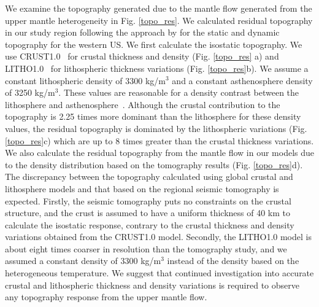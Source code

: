 \documentclass[draft,linenumbers]{agujournal2018}
\begin{document}
    We examine the topography generated due to the mantle flow generated from the upper mantle heterogeneity in Fig. \ref{topo_res}. We calculated residual topography in our study region following the approach by \citet{becker2014static} for the static and dynamic topography for the western US. We first calculate the isostatic topography. We use CRUST1.0~\citep{laske2013update} for crustal thickness and density (Fig. \ref{topo_res} a) and LITHO1.0~\citep{pasyanos2014litho1} for lithospheric thickness variations (Fig. \ref{topo_res}b). We assume a constant lithospheric density of 3300 kg/m$^3$ and a constant asthenosphere density of 3250 kg/m$^3$. These values are reasonable for a density contrast between the lithosphere and asthenosphere~\citep[e.g.,][]{bonnardot2008numerical, ito2011probing}. Although the crustal contribution to the topography is 2.25 times more dominant than the lithosphere for these density values, the residual topography is dominated by the lithospheric variations (Fig. \ref{topo_res}c) which are up to 8 times greater than the crustal thickness variations. We also calculate the residual topography from the mantle flow in our models due to the density distribution based on the \citet{Biryol_2016} tomography results (Fig. \ref{topo_res}d). The discrepancy between the topography calculated using global crustal and lithosphere models and that based on the regional seismic tomography is expected. Firstly, the seismic tomography puts no constraints on the crustal structure, and the crust is assumed to have a uniform thickness of 40 km to calculate the isostatic response, contrary to the crustal thickness and density variations obtained from the CRUST1.0 model. Secondly, the LITHO1.0 model is about eight times coarser in resolution than the tomography study, and we assumed a constant density of 3300 kg/m$^3$ instead of the density based on the heterogeneous temperature. We suggest that continued investigation into accurate crustal and lithospheric thickness and density variations is required to observe any topography response from the upper mantle flow.
%
\end{document}
